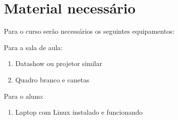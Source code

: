 \documentclass[12pt,brazil]{article}
\begin{document}
\section{Material necessário}
\label{sec:material}

Para o curso serão necessários os seguintes equipamentos:

Para a sala de aula:
\begin{enumerate}
\item Datashow ou projetor similar
\item Quadro branco e canetas
\end{enumerate}

Para o aluno:
\begin{enumerate}
\item Laptop com Linux instalado e funcionando
\end{enumerate}
\end{document}
